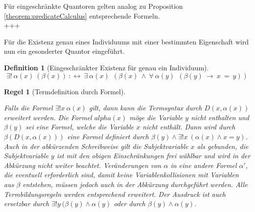 \documentclass[a4paper,german,10pt,twoside]{book}
\newtheorem{rul}{Regel}
\theoremstyle{definition}
\newtheorem{defn}[thm]{Definition}
\theoremstyle{remark}
\begin{document}
F{\"u}r eingeschr{\"a}nkte Quantoren gelten analog zu Proposition \ref{theorem:predicateCalculus} entsprechende Formeln.
\\
+++


\par
F{\"u}r die Existenz genau eines Individuums mit einer bestimmten Eigenschaft wird nun ein gesonderter Quantor eingef{\"u}hrt.

\begin{defn}[Eingeschr{\"a}nkter Existenz f{\"u}r genau ein Individuum]
\label{definition:restrictedUniquenessQuantifier} \hypertarget{definition:restrictedUniquenessQuantifier}{}
$$\exists! \ \alpha(x) \ (\beta(x))\ :\leftrightarrow \ \exists \ \alpha(x)\ \ (\beta(x)\ \land \ \forall \ \alpha(y)\ \ (\beta(y)\ \rightarrow \ x \ =  \ y))$$

\end{defn}




\begin{rul}[Termdefinition durch Formel]\hypertarget{rule:termdef}{}
Falls die Formel $\exists! x \ \alpha(x)$ gilt, dann kann die Termsyntax durch $D(x, \alpha(x))$ erweitert werden. Die Formel $alpha(x)$ m{\"o}ge die Variable $y$ nicht enthalten und $\beta(y)$ sei eine Formel, welche die Variable $x$ nicht enth{\"a}lt. Dann wird durch $\beta(D(x, \alpha(x)))$ eine
Formel definiert durch $\beta(y) \land \exists! x \ (\alpha(x) \land x = y)$. Auch in der abk{\"u}rzenden Schreibweise gilt die Subjektvariable $x$ als gebunden, die Subjektvariable $y$ ist mit den obigen Einschr{\"a}nkungen frei w{\"a}hlbar und wird in der Abk{\"u}rzung nicht weiter beachtet. Ver{\"a}nderungen von $\alpha$ in eine andere Formel $\alpha'$, die eventuell erforderlich sind, damit keine Variablenkollisionen mit Variablen aus $\beta$ entstehen, m{\"u}ssen jedoch auch in der Abk{\"u}rzung durchgef{\"u}hrt werden. Alle Termbildungsregeln werden entsprechend erweitert. Der Ausdruck ist auch ersetzbar durch $\exists! y \ (\beta(y) \land \alpha(y)$ oder durch $\beta(y) \land \alpha(y)$.
\end{rul}



\end{document}
